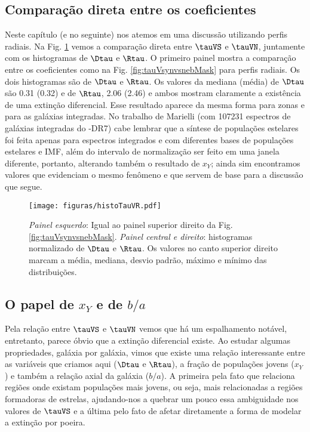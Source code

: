 \subsection{Comparação direta entre os coeficientes}
\label{sec:difextin:emp:comparetauV}

Neste capítulo (e no seguinte) nos atemos em uma discussão utilizando perfis radiais. Na Fig.
\ref{fig:tauVhisto} vemos a comparação direta entre $\tauVS$ e $\tauVN$, juntamente com os
histogramas de $\Dtau$ e $\Rtau$. O primeiro painel mostra a comparação entre os coeficientes como
na Fig. \ref{fig:tauVsynvsnebMask} para perfis radiais. Os dois histogramas são de $\Dtau$ e
$\Rtau$. Os valores da mediana (média) de $\Dtau$ são 0.31 (0.32) e de $\Rtau$, 2.06 (2.46) e ambos
mostram claramente a existência de uma extinção diferencial. Esse resultado aparece da mesma forma
para zonas e para as galáxias integradas. No trabalho de Marielli (com 107231 espectros de galáxias
integradas do \SDSS-DR7) cabe lembrar que a síntese de populações estelares foi feita apenas para
espectros integrados e com diferentes bases de populações estelares e IMF, além do intervalo de
normalização ser feito em uma janela diferente, portanto, alterando também o resultado de $x_Y$;
ainda sim encontramos valores que evidenciam o mesmo fenômeno e que servem de base para a discussão
que segue.

\begin{figure}
	\centering
	\texttt{[image: figuras/histoTauVR.pdf]}
	\caption[Comparação $\tauVS$ e histogramas de $\Dtau$ e $\Rtau$]
	{\emph{Painel esquerdo}: Igual ao painel superior direito da Fig. \ref{fig:tauVsynvsnebMask}.
\emph{Painel central e direito}: histogramas normalizado de $\Dtau$ e $\Rtau$. Os valores no canto
superior direito marcam a média, mediana, desvio padrão, máximo e mínimo das distribuições.}
	\label{fig:tauVhisto}
\end{figure}

\subsection{O papel de $x_Y$ e de $b/a$}
\label{sec:difextin:emp:xYcosi}

Pela relação entre $\tauVS$ e $\tauVN$ vemos que há um espalhamento notável, entretanto, parece óbvio
que a extinção diferencial existe. Ao estudar algumas propriedades, galáxia por galáxia, vimos que
existe uma relação interessante entre as variáveis que criamos aqui ($\Dtau$ e $\Rtau$), a fração
de populações jovens ($x_Y$) e também a relação axial da galáxia ($b/a$). A primeira pela fato que
relaciona regiões onde existam populações mais jovens, ou seja, mais relacionadas a regiões
formadoras de estrelas, ajudando-nos a quebrar um pouco essa ambiguidade nos valores de $\tauVS$ e
a última pelo fato de afetar diretamente a forma de modelar a extinção por poeira.

